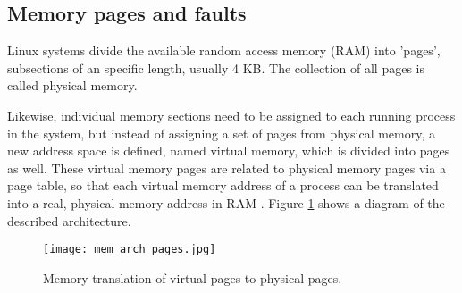 \subsection{Memory pages and faults} \label{subsection:mem_faults}
Linux systems divide the available random access memory (RAM) into 'pages', subsections of an specific length, usually 4 KB. The collection of all pages is called physical memory.

Likewise, individual memory sections need to be assigned to each running process in the system, but instead of assigning a set of pages from physical memory, a new address space is defined, named virtual memory, which is divided into pages as well. These virtual memory pages are related to physical memory pages via a page table, so that each virtual memory address of a process can be translated into a real, physical memory address in RAM \cite{mem_page_arch}. Figure \ref{fig:mem_arch_pages} shows a diagram of the described architecture.

\begin{figure}[htbp]
	\centering
	\texttt{[image: mem\_arch\_pages.jpg]}
	\caption{Memory translation of virtual pages to physical pages.}
	\label{fig:mem_arch_pages}
\end{figure}

